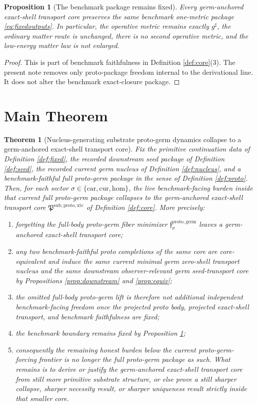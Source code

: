 \documentclass[11pt]{article}
\newcommand{\CompletedMetric}{g^{\sharp}}
\newcommand{\Car}{\mathrm{car}}
\newcommand{\Cur}{\mathrm{cur}}
\newcommand{\Hom}{\mathrm{hom}}
\newcommand{\ProtoTransportCore}{\mathfrak P^{\mathrm{sub,proto,xtc}}}
\newcommand{\ProtoGermMin}[1]{\mathfrak f_{#1}^{\mathrm{proto,germ}}}
\newtheorem{proposition}{Proposition}
\newtheorem{theorem}{Theorem}
\begin{document}
\begin{proposition}[The benchmark package remains fixed]
\label{prop:benchmark}
Every germ-anchored exact-shell transport core preserves the same benchmark one-metric package \eqref{eq:fixedoutputs}. In particular, the operative metric remains exactly \(\CompletedMetric\), the ordinary matter route is unchanged, there is no second operative metric, and the low-energy matter law is not enlarged.
\end{proposition}

\begin{proof}
This is part of benchmark faithfulness in Definition \ref{def:core}(3). The present note removes only proto-package freedom internal to the derivational line. It does not alter the benchmark exact-closure package.
\end{proof}

\section{Main Theorem}

\begin{theorem}[Nucleus-generating substrate proto-germ dynamics collapse to a germ-anchored exact-shell transport core]
\label{thm:main}
Fix the primitive continuation data of Definition \ref{def:fixed}, the recorded downstream seed package of Definition \ref{def:seed}, the recorded current germ nucleus of Definition \ref{def:nucleus}, and a benchmark-faithful full proto-germ package in the sense of Definition \ref{def:proto}. Then, for each sector \(\sigma\in\{\Car,\Cur,\Hom\}\), the live benchmark-facing burden inside that current full proto-germ package collapses to the germ-anchored exact-shell transport core \(\ProtoTransportCore\) of Definition \ref{def:core}. More precisely:
\begin{enumerate}
    \item forgetting the full-body proto-germ fiber minimizer \(\ProtoGermMin{\sigma}\) leaves a germ-anchored exact-shell transport core;
    \item any two benchmark-faithful proto completions of the same core are core-equivalent and induce the same current minimal germ zero-shell transport nucleus and the same downstream observer-relevant germ seed-transport core by Propositions \ref{prop:downstream} and \ref{prop:equiv};
    \item the omitted full-body proto-germ lift is therefore not additional independent benchmark-facing freedom once the projected proto body, projected exact-shell transport, and benchmark faithfulness are fixed;
    \item the benchmark boundary remains fixed by Proposition \ref{prop:benchmark};
    \item consequently the remaining honest burden below the current proto-germ-forcing frontier is no longer the full proto-germ package as such. What remains is to derive or justify the germ-anchored exact-shell transport core from still more primitive substrate structure, or else prove a still sharper collapse, sharper necessity result, or sharper uniqueness result strictly inside that smaller core.
\end{enumerate}
\end{theorem}
\end{document}
